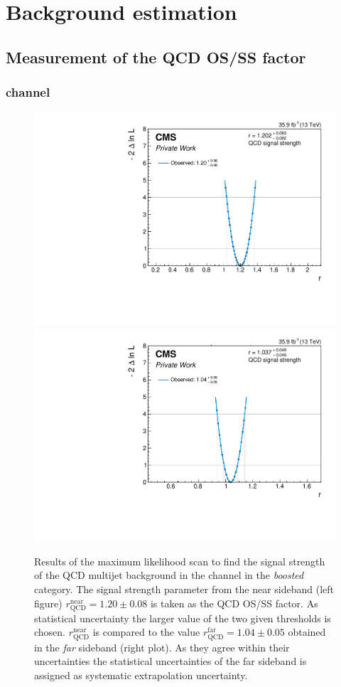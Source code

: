 %
\section{Background estimation}

\subsection{Measurement of the QCD OS/SS factor}\label{suppsec:fits}

\subsubsection{\etau{} channel}

\begin{figure}[h!]
    \centering
    \includegraphics[width=.49\textwidth]{Figures/background_estimation/RQCDOSSS/Scans/et_ZeroJet2D_antiiso_near/plots/nll.pdf}
    \includegraphics[width=.49\textwidth]{Figures/background_estimation/RQCDOSSS/Scans/et_ZeroJet2D_antiiso_far/plots/nll.pdf}
    \caption[Results of the maximum likelihood scan for $R_\text{QCD}^\text{OS/SS}$ in the \etau{} channel for the \textit{0-jet} category.]{Results of the maximum likelihood scan to find the signal strength of the QCD multijet background in the \etau channel in the \textit{boosted} category.
    The signal strength parameter from the near sideband (left figure) $r^{\text{near}}_\text{QCD} = 1.20\pm 0.08$ is taken as the QCD OS/SS factor. As statistical uncertainty the larger value of the two given thresholds is chosen. 
    $r^{\text{near}}_\text{QCD}$ is compared to the value $r^{\text{far}}_\text{QCD} = 1.04\pm 0.05$ obtained in the \textit{far} sideband (right plot). As they agree within their uncertainties the statistical uncertainties of the far sideband is assigned as systematic extrapolation uncertainty.}\label{SUPPLE:BK:Scans:et_0jet}
\end{figure}%
 


